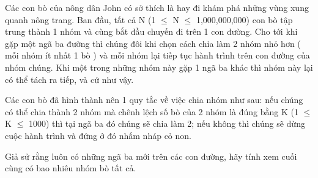 Các con bò của nông dân John có sở thích là hay đi khám phá những  vùng xung quanh nông trang. Ban đầu, tất cả N (1  $\le$  N  $\le$  1,000,000,000)  con bò tập trung thành 1 nhóm và cùng bắt đầu chuyến đi trên  1 con đường. Cho tới khi gặp một ngã ba đường thì chúng đôi  khi chọn cách chia làm 2 nhóm nhỏ hơn ( mỗi nhóm ít nhất 1 bò )  và mỗi nhóm lại tiếp tục hành trình trên con đường của nhóm  chúng. Khi một trong những nhóm này gặp 1 ngã ba khác thì nhóm  này lại có thể tách ra tiếp, và cứ như vậy.  

   Các con bò đã hình thành nên 1 quy tắc về việc chia nhóm như sau: nếu  chúng có thể chia thành 2 nhóm mà chênh lệch số bò của 2 nhóm là đúng  bằng K (1  $\le$  K  $\le$  1000) thì tại ngã ba đó chúng sẽ chia làm 2; nếu  không thì chúng sẽ dừng cuộc hành trình và đứng ở đó nhấm nháp cỏ non.  

   Giả sử rằng luôn có những ngã ba mới trên các con đường, hãy  tính xem cuối cùng có bao nhiêu nhóm bò tất cả.
